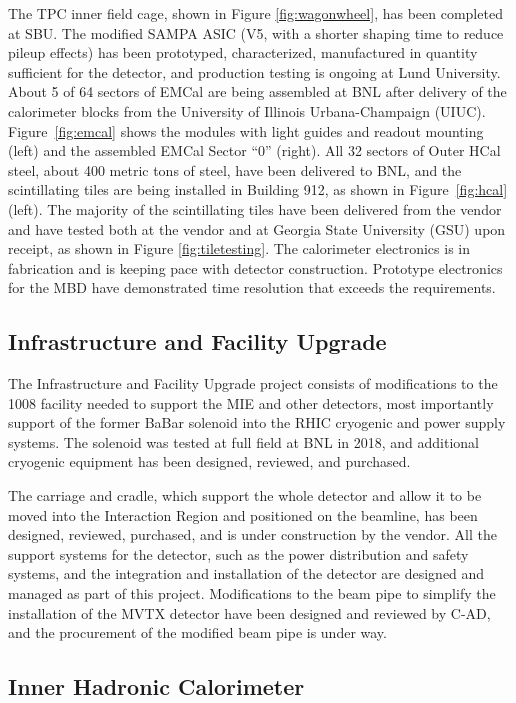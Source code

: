 The TPC inner field cage, shown in Figure \ref{fig:wagonwheel}, has been completed at SBU. The modified SAMPA ASIC (V5, with a shorter shaping time to reduce pileup effects)
has been prototyped, characterized, manufactured in quantity sufficient for the detector, and production testing is ongoing at Lund University.
About 5 of 64 sectors of EMCal are being assembled at BNL after delivery of the
calorimeter blocks from the University of Illinois Urbana-Champaign (UIUC).  Figure~\ref{fig:emcal} shows the modules with light guides and readout mounting (left) and the assembled EMCal Sector ``0'' (right).
All 32 sectors of Outer HCal steel, about 400 metric tons of steel,
have been delivered to BNL, and the scintillating tiles are being installed
in Building 912, as shown in Figure~\ref{fig:hcal} (left).
The majority of the scintillating tiles have been delivered from the vendor
and have tested both at the vendor and at Georgia State University (GSU) upon receipt, as shown in Figure \ref{fig:tiletesting}.
The calorimeter electronics is in fabrication and is keeping pace with detector
construction.
Prototype electronics for the MBD have demonstrated time resolution that exceeds the
requirements.

\subsection{Infrastructure and Facility Upgrade}

The Infrastructure and Facility Upgrade project consists of modifications to the 
1008 facility needed to support the MIE and other detectors, most importantly 
support of the former BaBar solenoid into the RHIC cryogenic and power supply
systems.  
The solenoid was tested at full field at BNL in 2018, and additional cryogenic
equipment has been designed, reviewed, and purchased.

The carriage and cradle, which support the whole detector and allow it to be 
moved into the Interaction Region and positioned on the beamline, has been designed,
reviewed, purchased, and is under construction by the vendor.
All the support systems for the detector, such as the power distribution and safety systems, and the integration and installation of the detector are designed and managed as part of this project.
Modifications to the beam pipe to simplify the installation of the MVTX detector
have been designed and reviewed by C-AD, and the procurement of the modified beam pipe 
is under way.

\subsection{Inner Hadronic Calorimeter}

